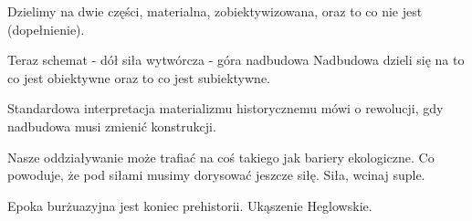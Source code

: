 \documentclass[11pt]{article}
\begin{document}
Dzielimy na dwie części, materialna, zobiektywizowana, oraz to co nie jest (dopełnienie).

Teraz schemat - dół siła wytwórcza - góra nadbudowa
Nadbudowa dzieli się na to co jest obiektywne oraz to co jest subiektywne. 

Standardowa interpretacja materializmu historycznemu mówi o rewolucji, gdy nadbudowa musi zmienić konstrukcji.

Nasze oddziaływanie może trafiać na coś takiego jak bariery ekologiczne. Co powoduje, że pod siłami musimy dorysować jeszcze siłę. Siła, wcinaj suple.

Epoka burżuazyjna jest koniec prehistorii. Ukąszenie Heglowskie.
\end{document}
